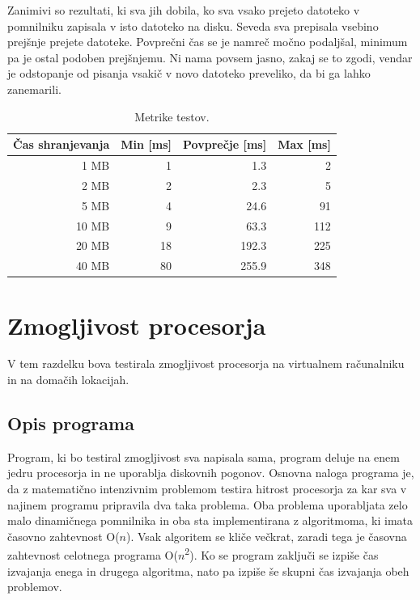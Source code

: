 Zanimivi so rezultati, ki sva jih dobila, ko sva vsako prejeto datoteko v pomnilniku zapisala v isto datoteko na disku. Seveda sva prepisala vsebino prejšnje prejete datoteke. Povprečni čas se je namreč močno podaljšal, minimum pa je ostal podoben prejšnjemu. Ni nama povsem jasno, zakaj se to zgodi, vendar je odstopanje od pisanja vsakič v novo datoteko preveliko, da bi ga lahko zanemarili.

\begin{table}[H]
	\centering
	\begin{tabular}{ | r | r | r | r | }
		\hline
		Čas shranjevanja & Min [ms] & Povprečje [ms] & Max [ms]  \\
		\hline
		1 MB & 1 & 1.3 & 2 \\
		2 MB & 2 & 2.3 & 5 \\
		5 MB & 4 & 24.6 & 91 \\
		10 MB & 9 & 63.3 & 112 \\
		20 MB & 18 & 192.3 & 225 \\
		40 MB & 80 & 255.9 & 348 \\
		\hline
	\end{tabular}
	\caption{Metrike  testov.}
	\label{table:1_chunks}
\end{table}

\section{Zmogljivost procesorja}

V tem razdelku bova testirala zmogljivost procesorja na virtualnem računalniku in na domačih lokacijah.


\subsection{Opis programa}

Program, ki bo testiral zmogljivost sva napisala sama, program deluje na enem jedru procesorja in ne uporablja diskovnih pogonov.
Osnovna naloga programa je, da z matematično intenzivnim problemom testira hitrost procesorja za kar sva v najinem programu pripravila dva taka problema. Oba problema uporabljata zelo malo dinamičnega pomnilnika in oba sta implementirana z algoritmoma, ki imata časovno zahtevnost O($n$). Vsak algoritem se kliče večkrat, zaradi tega je časovna zahtevnost celotnega programa O($n$\textsuperscript{2}). Ko se program zaključi se izpiše čas izvajanja enega in drugega algoritma, nato pa izpiše še skupni čas izvajanja obeh problemov.



